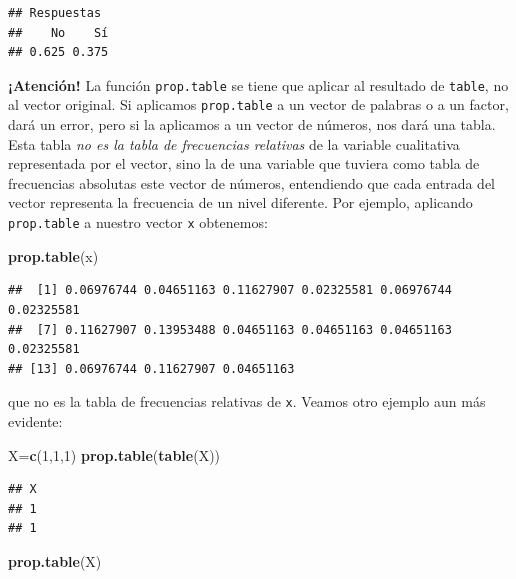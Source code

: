 \documentclass[]{book}
\newenvironment{Shaded}{\begin{snugshade}}{\end{snugshade}}
\newcommand{\DecValTok}[1]{\textcolor[rgb]{0.00,0.00,0.81}{#1}}
\newcommand{\KeywordTok}[1]{\textcolor[rgb]{0.13,0.29,0.53}{\textbf{#1}}}
\newcommand{\NormalTok}[1]{#1}
\theoremstyle{definition}
\theoremstyle{definition}
\theoremstyle{definition}
\theoremstyle{remark}
\begin{document}
\begin{verbatim}
## Respuestas
##    No    Sí 
## 0.625 0.375
\end{verbatim}

\textbf{¡Atención!} La función \texttt{prop.table} se tiene que aplicar al resultado de \texttt{table}, no al vector original. Si aplicamos \texttt{prop.table} a un vector de palabras o a un factor, dará un error, pero si la aplicamos a un vector de números, nos dará una tabla. Esta tabla \emph{no es la tabla de frecuencias relativas} de la variable cualitativa representada por el vector, sino la de una variable que tuviera como tabla de frecuencias absolutas este vector de números, entendiendo que cada entrada del vector representa la frecuencia de un nivel diferente. Por ejemplo, aplicando \texttt{prop.table} a nuestro vector \texttt{x} obtenemos:

\begin{Shaded}
\begin{Highlighting}[]
\KeywordTok{prop.table}\NormalTok{(x)}
\end{Highlighting}
\end{Shaded}

\begin{verbatim}
##  [1] 0.06976744 0.04651163 0.11627907 0.02325581 0.06976744 0.02325581
##  [7] 0.11627907 0.13953488 0.04651163 0.04651163 0.04651163 0.02325581
## [13] 0.06976744 0.11627907 0.04651163
\end{verbatim}

que no es la tabla de frecuencias relativas de \texttt{x}. Veamos otro ejemplo aun más evidente:

\begin{Shaded}
\begin{Highlighting}[]
\NormalTok{X=}\KeywordTok{c}\NormalTok{(}\DecValTok{1}\NormalTok{,}\DecValTok{1}\NormalTok{,}\DecValTok{1}\NormalTok{)}
\KeywordTok{prop.table}\NormalTok{(}\KeywordTok{table}\NormalTok{(X))}
\end{Highlighting}
\end{Shaded}

\begin{verbatim}
## X
## 1 
## 1
\end{verbatim}

\begin{Shaded}
\begin{Highlighting}[]
\KeywordTok{prop.table}\NormalTok{(X)}
\end{Highlighting}
\end{Shaded}
\end{document}
